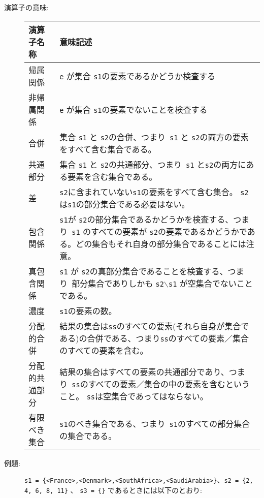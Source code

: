 \documentclass[\pformat,12pt]{jarticle}
\newenvironment{TypeSemantics}{\begin{longtable}[r]{|p{3.5cm}|p{9cm}|}\hline%
  演算子名称 & 意味記述 \\ \hline\hline \endhead}%
  {\hline\end{longtable}}
\begin{document}
\begin{description}
\item[演算子の意味:] \mbox{}

\begin{TypeSemantics}
帰属関係 &  {\tt e} が集合 {\tt s1}の要素であるかどうか検査する \\ \hline
非帰属関係 &  {\tt e} が集合 {\tt s1}の要素でないことを検査する \\ \hline
合併 & 集合 {\tt s1} と {\tt s2}の合併、つまり\  {\tt s1} と {\tt s2}の両方の要素をすべて含む集合である。 \\ \hline
共通部分 & 集合 {\tt s1} と {\tt s2}の共通部分、つまり\  {\tt s1} と{\tt s2}の両方にある要素を含む集合である。 \\ \hline
差 &  {\tt s2}に含まれていない{\tt s1}の要素をすべて含む集合。 {\tt s2} は{\tt s1}の部分集合である必要はない。 \\ \hline
包含関係 &  {\tt s1}が {\tt s2}の部分集合であるかどうかを検査する、つまり\  {\tt s1} のすべての要素が {\tt s2}の要素であるかどうかである。どの集合もそれ自身の部分集合であることには注意。 \\ \hline
真包含関係 &  {\tt s1} が {\tt s2}の真部分集合であることを検査する、つまり\ 部分集合でありしかも {\tt s2$\backslash$s1} が空集合でないことである。 \\ \hline
濃度 &  {\tt s1}の要素の数。 \\ \hline
分配的合併 & 結果の集合は{\tt ss}のすべての要素(それら自身が集合である)の合併である、つまり{\tt ss}のすべての要素／集合のすべての要素を含む。 \\ \hline
分配的共通部分 & 結果の集合はすべての要素の共通部分であり、つまり\ {\tt ss}のすべての要素／集合の中の要素を含むということ。 {\tt ss}は空集合であってはならない。 \\ \hline
有限べき集合 & {\tt s1}のべき集合である、つまり\  {\tt s1}のすべての部分集合の集合である。 \\ \hline
\end{TypeSemantics}

\item[例題:]%
  {\tt s1 = \{<France>,<Denmark>,<SouthAfrica>,<SaudiArabia>\}}、{\tt s2 = \{2, 4, 6, 8, 11\}} 、 {\tt s3 = \{\}} であるときには以下のとおり: 


\end{description}
\end{document}
